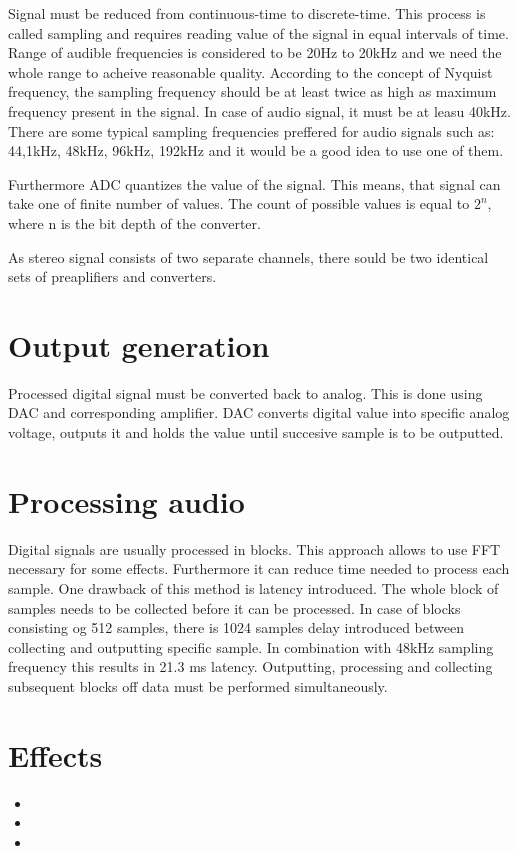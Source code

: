 \documentclass[a4paper,twoside,12pt]{book}
\begin{document}
Signal must be reduced from continuous-time to discrete-time.
This process is called sampling and requires reading value of the signal in equal intervals of time.
Range of audible frequencies is considered to be 20Hz to 20kHz
and we need the whole range to acheive reasonable quality.
According to the concept of Nyquist frequency, the sampling frequency should be at least
twice as high as maximum frequency present in the signal.
In case of audio signal, it must be at leasu 40kHz.
There are some typical sampling frequencies preffered for audio signals such as: 44,1kHz, 48kHz,
96kHz, 192kHz and it would be a good idea to use one of them.

Furthermore ADC quantizes the value of the signal.
This means, that signal can take one of finite number of values.
The count of possible values is equal to \(2^n\), where n is the bit depth of the converter.

As stereo signal consists of two separate channels,
there sould be two identical sets of preaplifiers and converters.

\section{Output generation}
Processed digital signal must be converted back to analog.
This is done using DAC and corresponding amplifier.
DAC converts digital value into specific analog voltage,
outputs it and holds the value until succesive sample is to be outputted.

\section{Processing audio}
Digital signals are usually processed in blocks.
This approach allows to use FFT necessary for some effects.
Furthermore it can reduce time needed to process each sample.
One drawback of this method is latency introduced.
The whole block of samples needs to be collected before it can be processed.
In case of blocks consisting og 512 samples,
there is 1024 samples delay introduced between collecting and outputting specific sample.
In combination with 48kHz sampling frequency this results in 21.3 ms latency.
Outputting, processing and collecting subsequent blocks off data must be performed simultaneously.

\section{Effects}
\begin{itemize}
    \item
    \item
    \item
\end{itemize}
\end{document}
